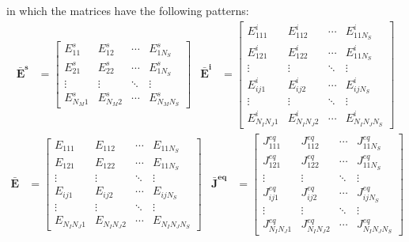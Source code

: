 			\noindent in which the matrices have the following patterns:
			\begin{align}
				\mathbf{\bar{E}^s} &= \begin{bmatrix}
													E^s_{11} & E^s_{12} & \cdots & E^s_{1N_S} \\
													E^s_{21} & E^s_{22} & \cdots & E^s_{1N_S} \\
													\vdots & \vdots & \ddots & \vdots \\
													E^s_{N_M1} & E^s_{N_M2} & \cdots & E^s_{N_MN_S}
												\end{bmatrix}
				&\mathbf{\bar{E}^i} &=	\begin{bmatrix}
														E^i_{111} & E^i_{112} & \cdots & E^i_{11N_S} \\
														E^i_{121} & E^i_{122} & \cdots & E^i_{11N_S} \\
														\vdots & \vdots & \ddots & \vdots \\
														E^i_{ij1} & E^i_{ij2} & \cdots & E^i_{ijN_S} \\
														\vdots & \vdots & \ddots & \vdots \\
														E^i_{N_IN_J1} & E^i_{N_IN_J2} & \cdots & E^i_{N_IN_JN_S}
													\end{bmatrix} \label{eq:3:discretization:collocation:15}
			\end{align}
			\begin{align}
				\mathbf{\bar{E}} &=   \begin{bmatrix}
													E_{111} & E_{112} & \cdots & E_{11N_S} \\
													E_{121} & E_{122} & \cdots & E_{11N_S} \\
													\vdots & \vdots & \ddots & \vdots \\
													E_{ij1} & E_{ij2} & \cdots & E_{ijN_S} \\
													\vdots & \vdots & \ddots & \vdots \\
													E_{N_IN_J1} & E_{N_IN_J2} & \cdots & E_{N_IN_JN_S}
												\end{bmatrix} 
			&\mathbf{\bar{J}^{eq}} &=	\begin{bmatrix}
															J^{eq}_{111} & J^{eq}_{112} & \cdots & J^{eq}_{11N_S} \\
															J^{eq}_{121} & J^{eq}_{122} & \cdots & J^{eq}_{11N_S} \\
															\vdots & \vdots & \ddots & \vdots \\
															J^{eq}_{ij1} & J^{eq}_{ij2} & \cdots & J^{eq}_{ijN_S} \\
															\vdots & \vdots & \ddots & \vdots \\
															J^{eq}_{N_IN_J1} & J^{eq}_{N_IN_J2} & \cdots & J^{eq}_{N_IN_JN_S}
														\end{bmatrix} \label{eq:3:discretization:collocation:16}
			\end{align}
